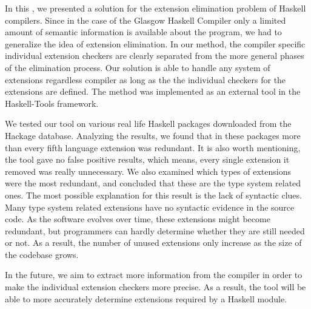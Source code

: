 \documentclass[main.tex]{subfiles}
\begin{document}
	
	In this \paper{}, we presented a solution for the extension elimination problem of Haskell compilers. Since in the case of the Glasgow Haskell Compiler only a limited amount of semantic information is available about the program, we had to generalize the idea of extension elimination. In our method, the compiler specific individual extension checkers are clearly separated from the more general phases of the elimination process. Our solution is able to handle any system of extensions regardless compiler as long as the the individual checkers for the extensions are defined. The method was implemented as an external tool in the Haskell-Tools framework.
	
	We tested our tool on various real life Haskell packages downloaded from the Hackage database. Analyzing the results, we found that in these packages more than every fifth language extension was redundant. It is also worth mentioning, the tool gave no false positive results, which means, every single extension it removed was really unnecessary. We also examined which types of extensions were the most redundant, and concluded that these are the type system related ones. The most possible explanation for this result is the lack of syntactic clues. Many type system related extensions have no syntactic evidence in the source code. As the software evolves over time, these extensions might become redundant, but programmers can hardly determine whether they are still needed or not. As a result, the number of unused extensions only increase as the size of the codebase grows.
	
	In the future, we aim to extract more information from the compiler in order to make the individual extension checkers more precise. As a result, the tool will be able to more accurately determine extensions required by a Haskell module.
	
\end{document}
